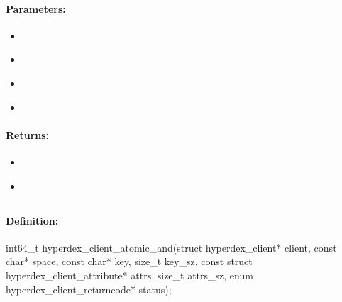 \paragraph{Parameters:}
\begin{itemize}[noitemsep]
\item {}\\

\item {}\\

\item {}\\

\item {}\\

\end{itemize}

\paragraph{Returns:}
\begin{itemize}[noitemsep]
\item {}\\

\item {}\\

\end{itemize}

\pagebreak
\subsection{}
\label{api:c:atomic_and}


\paragraph{Definition:}
\begin{ccode}
int64_t hyperdex_client_atomic_and(struct hyperdex_client* client,
        const char* space,
        const char* key, size_t key_sz,
        const struct hyperdex_client_attribute* attrs, size_t attrs_sz,
        enum hyperdex_client_returncode* status);
\end{ccode}

